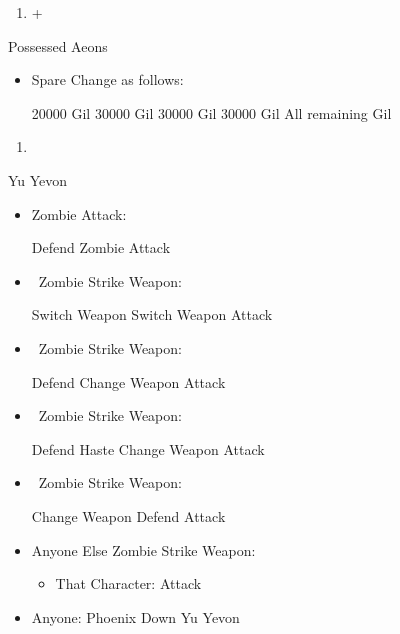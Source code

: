 \colend
\begin{enumerate}[resume]
    \item \cs+\skippablefmv[4:00]
\end{enumerate}
\begin{battle}{Possessed Aeons}
    \begin{itemize}
        \item Spare Change as follows:
        \begin{itemize}
            \valeforf \num{20000} Gil
            \ifritf \num{30000} Gil
            \ixionf \num{30000} Gil
            \shivaf \num{30000} Gil
            \bahamutf All remaining Gil
        \end{itemize}
    \end{itemize}
\end{battle}
\begin{enumerate}[resume]
    \item \cs[1:40]
\end{enumerate}
\begin{battle}[99999]{Yu Yevon}
    \begin{itemize}
        \item Zombie Attack:
        \begin{itemize}
            \yunaf Defend
            \tidusf Zombie Attack
        \end{itemize}
        \item \yuna\ Zombie Strike Weapon:
        \begin{itemize}
            \yunaf Switch Weapon
            \tidusf Switch Weapon
            \yunaf Attack
        \end{itemize}
        \item \tidus\ Zombie Strike Weapon:
        \begin{itemize}
            \yunaf Defend
            \tidusf Change Weapon
            \tidusf Attack
        \end{itemize}
        \item \rikku\ Zombie Strike Weapon:
        \begin{itemize}
            \yunaf Defend
            \tidusf Haste \rikku
            \yunaf Change Weapon
            \rikkuf Attack
        \end{itemize}
        \item \auron\ Zombie Strike Weapon:
        \begin{itemize}
            \switch{\yuna}{\auron}
            \auronf Change Weapon
            \tidusf Defend
            \auronf Attack
        \end{itemize}
        \item Anyone Else Zombie Strike Weapon:
        \begin{itemize}
            \item That Character: Attack
        \end{itemize}
        \item Anyone: Phoenix Down Yu Yevon
    \end{itemize}
\end{battle}
\bothvfill
\colstart